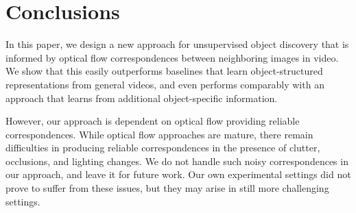 \documentclass{article}
\begin{document}
\begin{table}
  \caption{Quantitative comparison of flow-guided (ours) vs. other training objectives on \textbf{SIM}}
  \label{table:objective}
\end{table}

\section{Conclusions}\label{sec:conclusions}

In this paper, we design a new approach for unsupervised object discovery that is informed by optical flow correspondences between neighboring images in video. We show that this easily outperforms baselines that learn object-structured representations from general videos, and even performs comparably with an approach that learns from additional object-specific information.

However, our approach is dependent on optical flow providing reliable correspondences. While optical flow approaches are mature, there remain difficulties in producing reliable correspondences in the presence of clutter, occlusions, and lighting changes. We do not handle such noisy correspondences in our approach, and leave it for future work. Our own experimental settings did not prove to suffer from these issues, but they may arise in still more challenging settings.




\end{document}
